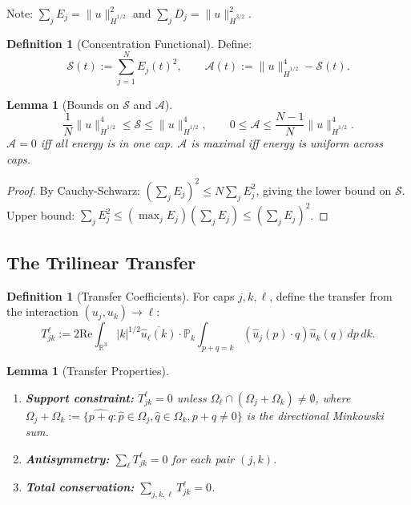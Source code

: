 \documentclass[11pt]{article}
\newtheorem{lemma}[theorem]{Lemma}
\theoremstyle{definition}
\newtheorem{definition}[theorem]{Definition}
\newcommand{\R}{\mathbb{R}}
\begin{document}
Note: $\sum_j E_j = \|u\|_{\dot{H}^{1/2}}^2$ and $\sum_j D_j = \|u\|_{\dot{H}^{3/2}}^2$.

\begin{definition}[Concentration Functional]
Define:
\begin{equation}
\mathcal{S}(t) := \sum_{j=1}^N E_j(t)^2, \qquad \mathcal{A}(t) := \|u\|_{\dot{H}^{1/2}}^4 - \mathcal{S}(t).
\end{equation}
\end{definition}

\begin{lemma}[Bounds on $\mathcal{S}$ and $\mathcal{A}$]\label{lem:SA-bounds}
\begin{equation}
\frac{1}{N}\|u\|_{\dot{H}^{1/2}}^4 \leq \mathcal{S} \leq \|u\|_{\dot{H}^{1/2}}^4, \qquad 0 \leq \mathcal{A} \leq \frac{N-1}{N}\|u\|_{\dot{H}^{1/2}}^4.
\end{equation}
$\mathcal{A} = 0$ iff all energy is in one cap. $\mathcal{A}$ is maximal iff energy is uniform across caps.
\end{lemma}

\begin{proof}
By Cauchy-Schwarz: $(\sum_j E_j)^2 \leq N \sum_j E_j^2$, giving the lower bound on $\mathcal{S}$.
Upper bound: $\sum_j E_j^2 \leq (\max_j E_j)(\sum_j E_j) \leq (\sum_j E_j)^2$.
\end{proof}

\subsection{The Trilinear Transfer}

\begin{definition}[Transfer Coefficients]
For caps $j, k, \ell$, define the transfer from the interaction $(u_j, u_k) \to \ell$:
\begin{equation}
T_{jk}^\ell := 2\text{Re} \int_{\R^3} |k|^{1/2} \overline{\hat{u}_\ell(k)} \cdot \mathbb{P}_k \int_{p+q=k} (\hat{u}_j(p) \cdot q) \hat{u}_k(q) \, dp \, dk.
\end{equation}
\end{definition}

\begin{lemma}[Transfer Properties]\label{lem:transfer-props}
\begin{enumerate}
\item \textbf{Support constraint:} $T_{jk}^\ell = 0$ unless $\Omega_\ell \cap (\Omega_j + \Omega_k) \neq \emptyset$, where $\Omega_j + \Omega_k := \{\widehat{p+q} : \hat{p} \in \Omega_j, \hat{q} \in \Omega_k, p+q \neq 0\}$ is the directional Minkowski sum.

\item \textbf{Antisymmetry:} $\sum_\ell T_{jk}^\ell = 0$ for each pair $(j,k)$.

\item \textbf{Total conservation:} $\sum_{j,k,\ell} T_{jk}^\ell = 0$.
\end{enumerate}
\end{lemma}
\end{document}
